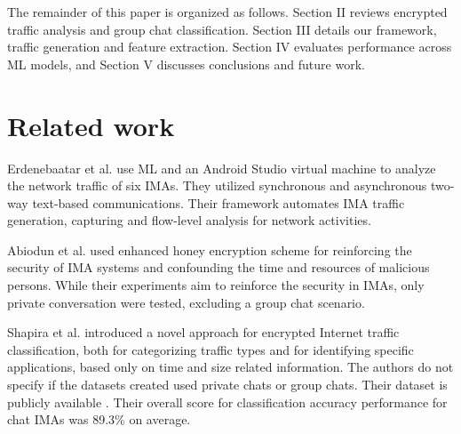 \documentclass[conference]{IEEEtran}
\begin{document}
The remainder of this paper is organized as follows. Section II reviews encrypted traffic analysis and group chat classification. Section III details our framework, traffic generation and feature extraction. Section IV evaluates performance across ML models, and Section V discusses conclusions and future work.


\section{Related work}

Erdenebaatar et al. \cite{b1} use ML and an Android Studio virtual machine to analyze the network traffic of six IMAs.
They utilized synchronous and asynchronous two-way text-based communications. Their framework automates IMA traffic generation, capturing and flow-level analysis for network activities.



Abiodun et al. \cite{b4} used enhanced honey encryption scheme for reinforcing the security of IMA systems and confounding the time and resources of malicious persons. While their experiments aim to reinforce the security in IMAs, only private conversation were tested, excluding a group chat scenario. 

Shapira et al. \cite{b8} introduced a novel approach for encrypted Internet traffic classification, both for categorizing traffic types and for identifying specific applications, based only on time and size related information. %
The authors do not specify if the datasets created used private chats or group chats.
Their dataset is publicly available \cite{b13}. Their overall score for classification accuracy performance for chat IMAs was 89.3\% on average. 
\end{document}
